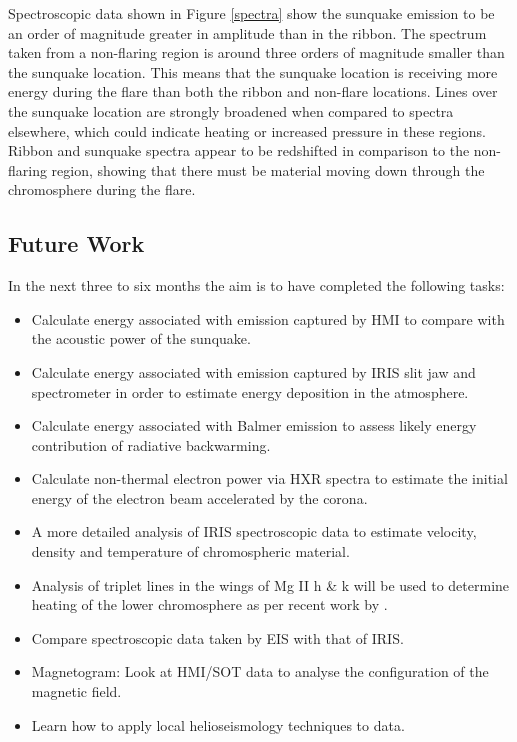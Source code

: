 Spectroscopic data shown in Figure \ref{spectra} show the sunquake emission to be an order of magnitude greater in amplitude than in the ribbon. The spectrum taken from a non-flaring region is around three orders of magnitude smaller than the sunquake location. This means that the sunquake location is receiving more energy during the flare than both the ribbon and non-flare locations. Lines over the sunquake location are strongly broadened when compared to spectra elsewhere, which could indicate heating or increased pressure in these regions. Ribbon and sunquake spectra appear to be redshifted in comparison to the non-flaring region, showing that there must be material moving down through the chromosphere during the flare.\\


\subsection{Future Work}
In the next three to six months the aim is to have completed the following tasks:
\begin{itemize}

\item Calculate energy associated with emission captured by HMI to compare with the acoustic power of the sunquake. 

\item Calculate energy associated with emission captured by IRIS slit jaw and spectrometer in order to estimate energy deposition in the atmosphere. 

\item Calculate energy associated with Balmer emission to assess likely energy contribution of radiative backwarming. 

\item Calculate non-thermal electron power via HXR spectra to estimate the initial energy of the electron beam accelerated by the corona. 


\item A more detailed analysis of IRIS spectroscopic data to estimate velocity, density and temperature of chromospheric material. 

\item Analysis of triplet lines in the wings of Mg II h \& k will be used to determine heating of the lower chromosphere as per recent work by \cite{2015arXiv150401733P}. 

\item Compare spectroscopic data taken by EIS with that of IRIS. 

\item Magnetogram: Look at HMI/SOT data to analyse the configuration of the magnetic field.

\item Learn how to apply local helioseismology techniques to data.

\end{itemize}
